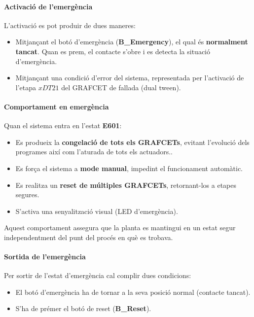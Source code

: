 \documentclass[a4paper,11pt,DIV=13,headings=normal,abstract=true,twoside=semi]{article}
\begin{document}
\paragraph{Activació de l'emergència}

L'activació es pot produir de dues maneres:

\begin{itemize}
\item Mitjançant el botó d'emergència (\textbf{B\_Emergency}), el qual és \textbf{normalment tancat}. Quan es prem, el contacte s'obre i es detecta la situació d'emergència.
\item Mitjançant una condició d'error del sistema, representada per l'activació de l'etapa $xDT21$ del GRAFCET de fallada (dual tween).
\end{itemize}

\paragraph{Comportament en emergència}

Quan el sistema entra en l'estat \textbf{E601}:

\begin{itemize}
\item Es produeix la \textbf{congelació de tots els GRAFCETs}, evitant l'evolució dels programes així com l'aturada de tots els actuadors..
\item Es força el sistema a \textbf{mode manual}, impedint el funcionament automàtic.
\item Es realitza un \textbf{reset de múltiples GRAFCETs}, retornant-los a etapes segures.
\item S'activa una senyalització visual (LED d'emergència).
\end{itemize}

Aquest comportament assegura que la planta es mantingui en un estat segur independentment del punt del procés en què es trobava.

\paragraph{Sortida de l'emergència}

Per sortir de l'estat d'emergència cal complir dues condicions:

\begin{itemize}
\item El botó d'emergència ha de tornar a la seva posició normal (contacte tancat).
\item S'ha de prémer el botó de reset (\textbf{B\_Reset}).
\end{itemize}
\end{document}
